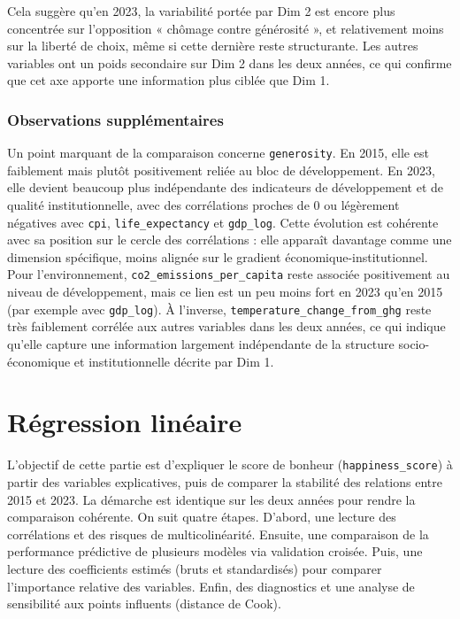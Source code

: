 \documentclass{article}
\begin{document}
Cela suggère qu’en 2023, la variabilité portée par Dim 2 est encore plus concentrée sur l’opposition « chômage contre générosité », et relativement moins sur la liberté de choix, même si cette dernière reste structurante.
Les autres variables ont un poids secondaire sur Dim 2 dans les deux années, ce qui confirme que cet axe apporte une information plus ciblée que Dim 1.

\subsubsection{Observations supplémentaires}

Un point marquant de la comparaison concerne \texttt{generosity}.
En 2015, elle est faiblement mais plutôt positivement reliée au bloc de développement.
En 2023, elle devient beaucoup plus indépendante des indicateurs de développement et de qualité institutionnelle, avec des corrélations proches de 0 ou légèrement négatives avec \texttt{cpi}, \texttt{life\_expectancy} et \texttt{gdp\_log}.
Cette évolution est cohérente avec sa position sur le cercle des corrélations : elle apparaît davantage comme une dimension spécifique, moins alignée sur le gradient économique-institutionnel.
Pour l’environnement, \texttt{co2\_emissions\_per\_capita} reste associée positivement au niveau de développement, mais ce lien est un peu moins fort en 2023 qu’en 2015 (par exemple avec \texttt{gdp\_log}).
À l’inverse, \texttt{temperature\_change\_from\_ghg} reste très faiblement corrélée aux autres variables dans les deux années, ce qui indique qu’elle capture une information largement indépendante de la structure socio-économique et institutionnelle décrite par Dim 1.

\newpage

\section{Régression linéaire}

L’objectif de cette partie est d’expliquer le score de bonheur (\texttt{happiness\_score}) à partir des variables explicatives, puis de comparer la stabilité des relations entre 2015 et 2023.
La démarche est identique sur les deux années pour rendre la comparaison cohérente.
On suit quatre étapes.
D’abord, une lecture des corrélations et des risques de multicolinéarité.
Ensuite, une comparaison de la performance prédictive de plusieurs modèles via validation croisée.
Puis, une lecture des coefficients estimés (bruts et standardisés) pour comparer l’importance relative des variables.
Enfin, des diagnostics et une analyse de sensibilité aux points influents (distance de Cook).
\end{document}

